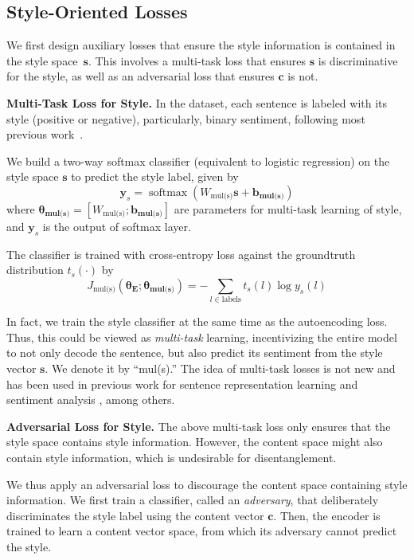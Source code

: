 \documentclass[11pt,a4paper]{article}
\newcommand{\loss}[1]{J_{\text{#1}}}
\newcommand{\nnweight}[1]{\bm{\theta_{\text{#1}}}}
\newcommand{\weight}[1]{W_{\text{#1}}}
\newcommand{\bias}[1]{\bm{b_{\text{#1}}}}
\begin{document}
\subsection{Style-Oriented Losses}

We first design auxiliary losses that ensure the style information is contained in the style space~$\bm s$.
This involves a multi-task loss that ensures $\bm s$ is discriminative for the style, as well as an adversarial loss that ensures $\bm c$ is not.

\textbf{Multi-Task Loss for Style.} In the dataset, each sentence is labeled with its style (positive or negative), particularly, binary sentiment, following most previous work~\cite{hu2017toward,shen2017style,fu2018style,zhao2018adversarially}.

We build a two-way softmax classifier (equivalent to logistic regression) on the style space $\bm s$ to predict the style label, given by
\begin{equation} \label{eqn:class-pred}
	\bm y_s = \operatorname{softmax}(\weight{mul(s)} \bm s + \bias{mul(s)})
\end{equation}
where $\nnweight{mul(s)}=[\weight{mul(s)}; \bias{mul(s)}]$ are parameters for multi-task learning of style, and $\bm y_s$ is the output of softmax layer.

The classifier is trained with cross-entropy loss against the groundtruth distribution $t_s(\cdot)$ by
\begin{equation} \label{eqn:style-multi-task-loss}
	\loss{mul(s)}(\nnweight{E};\nnweight{mul(s)}) = - \sum_{l\in\text{labels}} t_s(l)\log y_s(l)
\end{equation}

In fact, we train the style classifier at the same time as the autoencoding loss.
Thus, this could be viewed as \textit{multi-task} learning, incentivizing the entire model to not only decode the sentence, but also predict its sentiment from the style vector $\bm  s$.
We denote it by ``mul(s).''
The idea of multi-task losses is not new and has been used in previous work for sentence representation learning \cite{jernite2017discourse} and sentiment analysis \cite{balikas2017multitask}, among others.


\textbf{Adversarial Loss for Style.}
The above multi-task loss only ensures that the style space contains style information.
However, the content space might also contain style information, which is undesirable for disentanglement.

We thus apply an adversarial loss to discourage the content space containing style information.
We first train a classifier, called an \textit{adversary}, that deliberately discriminates the style label using the content vector $\bm c$.
Then, the encoder is trained to learn a content vector space, from which its adversary cannot predict the style.
\end{document}
